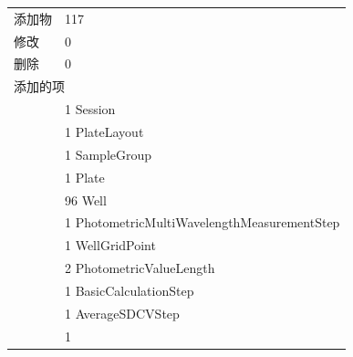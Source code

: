 \documentclass[UTF8,10pt,a4paper,fontset=fandol]{ctexart}
\newcommand{\fieldvalue}[1]{#1}
\begin{document}
\begin{tabular}{ll}
添加物 &
\fieldvalue{117}\\
修改 &
\fieldvalue{0}\\
删除 &
\fieldvalue{0}\\[2pt]

\multicolumn{2}{l}{添加的项}\\
&
\fieldvalue{1}\quad
\fieldvalue{Session}\\
&
\fieldvalue{1}\quad
\fieldvalue{PlateLayout}\\
&
\fieldvalue{1}\quad
\fieldvalue{SampleGroup}\\
&
\fieldvalue{1}\quad
\fieldvalue{Plate}\\
&
\fieldvalue{96}\quad
\fieldvalue{Well}\\
&
\fieldvalue{1}\quad
\fieldvalue{PhotometricMultiWavelengthMeasurementStep}\\
&
\fieldvalue{1}\quad
\fieldvalue{WellGridPoint}\\
&
\fieldvalue{2}\quad
\fieldvalue{PhotometricValueLength}\\
&
\fieldvalue{1}\quad
\fieldvalue{BasicCalculationStep}\\
&
\fieldvalue{1}\quad
\fieldvalue{AverageSDCVStep}\\
&
\fieldvalue{1}\quad

\end{tabular}
\end{document}
